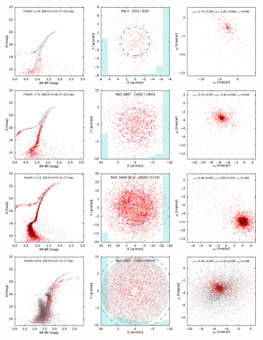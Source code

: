 \documentclass[usenatbib]{mnras}
\begin{document}
\clearpage\begin{figure}
\contcaption{}
\includegraphics{figs/Pal_5.pdf}
\includegraphics{figs/NGC_5897.pdf}
\includegraphics{figs/NGC_5904_M_5.pdf}
\includegraphics{figs/NGC_5927.pdf}
\end{figure}
\end{document}
